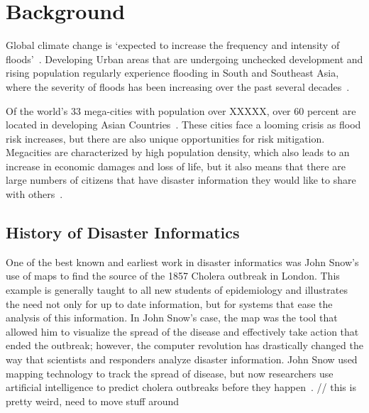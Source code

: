\chapter{Background}

Global climate change is `expected to increase the frequency and intensity of
floods'~\cite{ahernGlobalHealthImpacts2005}. Developing Urban areas that are
undergoing unchecked development and rising population regularly experience
flooding%
in South and Southeast Asia, where the severity of floods has been increasing
over the past several decades~\cite{tortiFloodsSoutheastAsia2012}.

Of the world's 33 mega-cities with population over XXXXX, over 60 percent are located in developing Asian
Countries~\cite{unitednationsdepartmentofeconomicandsocialaffairsWorldCities20162016}.
These cities face a looming crisis as flood risk increases, but there are also
unique opportunities for risk mitigation. Megacities are characterized by high
population density, which also leads to an increase in economic damages
and loss of life, but it also means that there are large numbers of citizens
that have disaster information they would like to share with
others~\cite{chanFloodRiskAsia2012}.

\section{History of Disaster Informatics} One of the best known and earliest
work in disaster informatics was John Snow's use of maps to find the source of
the 1857 Cholera outbreak in London\cite{rogersJohnSnowData2013}. This example
is generally taught to all new students of epidemiology and illustrates the need
not only for up to date information, but for systems that ease the
analysis of this information. In John Snow's case, the map was the tool that
allowed him to visualize the spread of the disease and effectively take action
that ended the outbreak; however, the computer revolution has drastically
changed the way that scientists and responders analyze disaster information.
John Snow used mapping technology to track the spread of disease, but now
researchers use artificial intelligence to predict cholera outbreaks before they
happen~\cite{radinskyMiningWebPredict2013}.
// this is pretty weird, need to move stuff around


